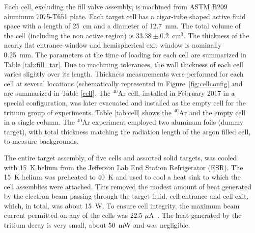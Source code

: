 \documentclass[final,5p,times,twocolumn]{elsarticle}
\begin{document}
Each cell, excluding the fill valve assembly, is machined from ASTM B209 aluminum 7075-T651 plate. Each target cell has a cigar-tube shaped 
active fluid space with a length of 25~cm and a diameter of 12.7~mm. The total volume of the cell (including the non active region) 
is $33.38 \pm 0.2$~cm$^{3}$. The thickness of the nearly flat entrance window and hemispherical exit window is nominally 0.25~mm. 
The parameters at the time of loading for each cell are summarized in Table \ref{tab:fill_tar}. Due to machining tolerances, the 
wall thickness of each cell varies slightly over its length. Thickness measurements were performed for each cell at several 
locations (schematically represented in Figure~\ref{fig:cellconfig} and are summarized in Table \ref{cell}. The $^{40}$Ar cell, 
installed in February 2017 in a special configuration, was later evacuated and installed as the empty cell for the tritium group 
of experiments. Table \ref{tab:cell} shows the $^{40}$Ar and the empty cell in a single column. The $^{40}$Ar experiment 
employed two aluminum foils (dummy target), with total thickness matching the radiation length of the argon filled cell, 
to measure backgrounds.

The entire target assembly, of five cells and assorted solid targets, was cooled with 15~K helium from 
the Jefferson Lab End Station Refrigerator (ESR). The 15~K helium was preheated to 40~K and used to cool 
a heat sink to which the cell assemblies were attached. This removed the modest amount of heat generated 
by the electron beam passing through the target fluid, cell entrance and cell exit, which, in total, 
was about 15~W.  To ensure cell integrity, the maximum beam current permitted on any of the cells was $22.5$ $\mu$A~\cite{engreport}. 
The heat generated by the tritium decay is very small, about 50~mW and was negligible.
\end{document}

